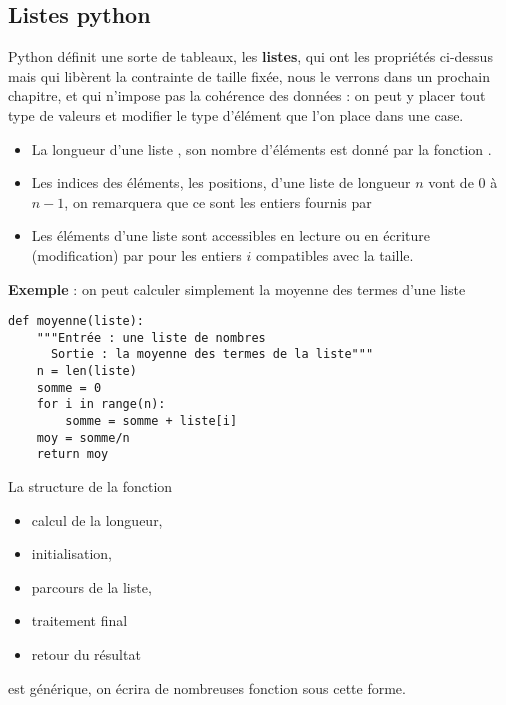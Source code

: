 \subsection{Listes python}
Python définit une sorte de tableaux, les {\bf listes}, qui ont les propriétés ci-dessus mais qui libèrent la contrainte de taille fixée, nous le verrons dans un prochain chapitre, et qui n'impose pas la cohérence des données : on peut y placer tout type de valeurs et modifier le type d'élément que l'on place dans une case.

\begin{itemize}
\item La longueur d'une liste , son nombre d'éléments est donné par la fonction .
\item Les indices des éléments, les positions, d'une liste de longueur $n$ vont de 0 à $n-1$, on remarquera que ce sont les entiers fournis par 
\item Les éléments d'une liste  sont accessibles en lecture ou en écriture (modification) par  pour les entiers $i$ compatibles avec la taille.
\end{itemize}

{\bf Exemple} : on peut calculer simplement la moyenne des termes d'une liste

\begin{lstlisting}
def moyenne(liste):
    """Entrée : une liste de nombres
      Sortie : la moyenne des termes de la liste"""
    n = len(liste)
    somme = 0
    for i in range(n):
        somme = somme + liste[i]
    moy = somme/n
    return moy
\end{lstlisting}

La structure de la fonction
\begin{itemize}
\item calcul de la longueur,
\item initialisation,
\item parcours de la liste,
\item traitement final 
\item retour du résultat
\end{itemize}
est générique, on écrira de nombreuses fonction sous cette forme.
